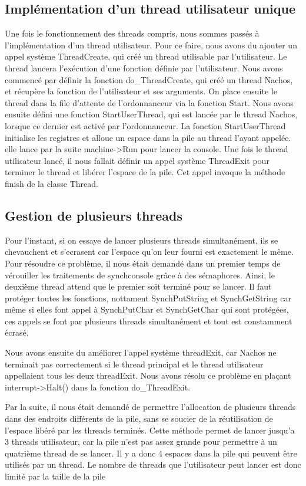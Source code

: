 \documentclass[12pt]{article}
\begin{document}
\subsection{Implémentation d'un thread utilisateur unique}
Une fois le fonctionnement des threads compris, nous sommes passés à l'implémentation d'un thread utilisateur.
Pour ce faire, nous avons du ajouter un appel système ThreadCreate, qui créé un thread utilisable par l'utilisateur. Le thread lancera l'exécution d'une fonction définie par l'utilisateur.
Nous avons commencé par définir la fonction do\_ThreadCreate, qui créé un thread Nachos, et récupère la fonction de l'utilisateur et ses arguments. On place ensuite le thread dans la file d'attente de l'ordonnanceur via la fonction Start.
Nous avons ensuite défini une fonction StartUserThread, qui est lancée par le thread Nachos, lorsque ce dernier est activé par l'ordonnanceur.
La fonction StartUserThread initialise les registres et alloue un espace dans la pile au thread l'ayant appelée. elle lance par la suite machine->Run pour lancer la console.
Une fois le thread utilisateur lancé, il nous fallait définir un appel système ThreadExit pour terminer le thread et libérer l'espace de la pile.
Cet appel invoque la méthode finish de la classe Thread.

\subsection{Gestion de plusieurs threads}
Pour l'instant, si on essaye de lancer plusieurs threads simultanément, ils se chevauchent et s'ecrasent car l'espace qu'on leur fourni est exactement le même.
Pour résoudre ce problème, il nous était demandé dans un premier temps de vérouiller les traitements de synchconsole grâce à des sémaphores. Ainsi, le deuxième thread attend que le premier soit terminé pour se lancer. Il faut protéger toutes les fonctions, nottament SynchPutString et SynchGetString car même si elles font appel à SynchPutChar et SynchGetChar qui sont protégées, ces appels se font par plusieurs threads simultanément et tout est constamment écrasé.

Nous avons ensuite du améliorer l'appel système threadExit, car Nachos ne terminait pas correctement si le thread principal et le thread utilisateur appellaient tous les deux threadExit. Nous avons
résolu ce problème en plaçant interrupt->Halt() dans la fonction do\_ThreadExit.

Par la suite, il nous était demandé de permettre l'allocation de plusieurs threads dans des endroits différents de la pile, sans se soucier de la réutilisation de l'espace libéré par les threads terminés.
Cette méthode permet de lancer jusqu'a 3 threads utilisateur, car la pile n'est pas assez grande pour permettre à un quatrième thread de se lancer. Il y a donc 4 espaces dans la pile qui peuvent être utilisés par un thread.
Le nombre de threads que l'utilisateur peut lancer est donc limité
par la taille de la pile
\end{document}
